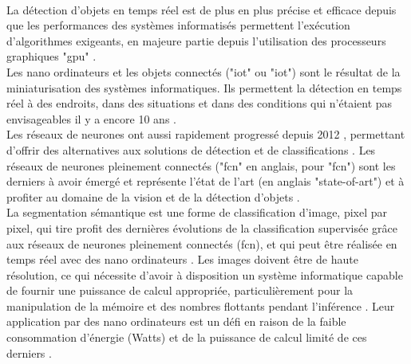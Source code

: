 \vspace{\baselineskip}
\\
\noindent La détection d'objets en temps réel est de plus en plus précise et efficace depuis que les performances des systèmes informatisés permettent l'exécution d'algorithmes exigeants, en majeure partie depuis l'utilisation des processeurs graphiques "\acrshort{gpu}" \parencite{chong_real-time_1992, dettmers_deep_2015, beam_deep_2017, jiaconda_concise_2019, zheng_real-time_2020, kurenkov_brief_2015}. 
\vspace{\baselineskip}
\\
\noindent Les nano ordinateurs et les objets connectés ("\acrlong{iot}" ou "\acrshort{iot}") \parencite{blanco-filgueira_deep_2019, sharma_history_2019} sont le résultat de la miniaturisation des systèmes informatiques. Ils permettent la détection en temps réel à des endroits, dans des situations et dans des conditions qui n'étaient pas envisageables il y a encore 10 ans \parencite{zheng_real-time_2020, bernas_edge_2017, abouzahir_iot-empowered_2017, blanco-filgueira_deep_2019}.
\vspace{\baselineskip}
\\
\noindent Les réseaux de neurones ont aussi rapidement progressé depuis 2012 \parencite{beam_deep_2017}, permettant d'offrir des alternatives aux solutions de détection et de classifications \parencite{pathak_architecturally_2019}. Les réseaux de neurones pleinement connectés ("\acrshort{fcn}" en anglais, pour "\acrlong{fcn}") sont les derniers à avoir émergé et représente l'état de l'art (en anglais "state-of-art") \parencite{zheng_real-time_2020} et à profiter au domaine de la vision et de la détection d'objets \parencite{nguyen_mavnet_2019, zheng_real-time_2020}.
\vspace{\baselineskip}
\\
\noindent La segmentation sémantique est une forme de classification d'image, pixel par pixel, qui tire profit des dernières évolutions de la classification supervisée grâce aux réseaux de neurones pleinement connectés (\acrshort{fcn}), et qui peut être réalisée en temps réel avec des nano ordinateurs \parencite{long_fully_2015, blanco-filgueira_deep_2019}. Les images doivent être de haute résolution, ce qui nécessite d'avoir à disposition un système informatique capable de fournir une puissance de calcul appropriée, particulièrement pour la manipulation de la mémoire et des nombres flottants pendant l'inférence \parencite{mody_low_2018}. Leur application par des nano ordinateurs est un défi en raison de la faible consommation d'énergie (Watts) et de la puissance de calcul limité de ces derniers \parencite{copel_whats_2016}.
